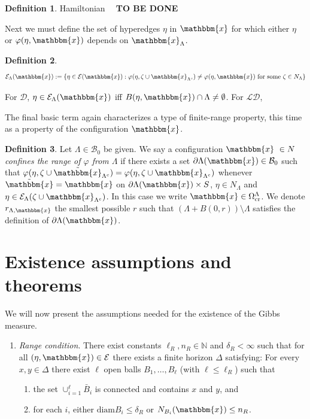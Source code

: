 \documentclass[12pt,a4paper]{article}
\theoremstyle{definition}
\newtheorem{definition}{Definition}
\theoremstyle{remark}
\theoremstyle{theorem}
\newcommand{\tbd}{\textbf{{\color{red}~ TO BE DONE ~}}}
\newcommand{\x}{\mathbbm{x}}
\begin{document}
\begin{definition} Hamiltonian \tbd
\end{definition}

Next we must define the set of hyperedges $\eta$ in $\x$ for which either $\eta$ or $\varphi(\eta,\x)$ depends on $\x_\Lambda$.

\begin{definition} 
$$\mathcal E_\Lambda(\x) := \{ \eta \in \mathcal E(\x): \varphi(\eta,\zeta \cup \x_{\Lambda^c}) \neq \varphi(\eta,\x) \text{ for some } \zeta \in N_\Lambda \}$$
\end{definition}

For $\mathcal D$, $\eta \in \mathcal E_\Lambda(\x)$ iff $B(\eta,\x) \cap \Lambda \neq \emptyset$. 
For $\mathcal {LD}$,   \newline

The final basic term again characterizes a type of finite-range property, this time as a property of the configuration $\x$.

\begin{definition}
	Let $\Lambda \in \mathcal B_0$ be given. We say a configuration $\x\ \in N$ \textit{confines the range of $\varphi$ from $\Lambda$} if there exists a set $\partial \Lambda(\x) \in \mathcal B_0$ such that $\varphi(\eta,\zeta \cup \tilde{\x}_{\Lambda^c}) = \varphi(\eta,\zeta\cup\x_{\Lambda^c})$ whenever $\tilde{\x} = \x$ on $\partial \Lambda(\x)\times S$, $\eta \in N_\Lambda$ and $\eta \in \mathcal E_\Lambda(\zeta\cup\x_{\Lambda^c})$. In this case we write $\x \in \Omega^\Lambda_\text{cr}$. We denote $r_{\Lambda,\x}$ the smallest possible $r$ such that $(\Lambda + B(0,r))\setminus \Lambda$ satisfies the definition of $\partial \Lambda(\x)$.
\end{definition}


\section{Existence assumptions and theorems}
We will now present the assumptions needed for the existence of the Gibbs measure.


\begin{enumerate}[\textbf{(R)}]
	\item \textit{Range condition}. There exist constants $\ell_R,n_R \in \mathbb N$ and $\delta_R < \infty$ such that for all $(\eta,\x) \in \mathcal E$ there exists a finite horizon $\Delta$ satisfying: For every $x,y \in \Delta$ there exist $\ell$ open balls $B_1, \dots, B_\ell$ (with $\ell \leq \ell_R$) such that
	\begin{enumerate}[-]
		\item the set $\cup^\ell_{i=1} \bar B_i$ is connected and contains $x$ and $y$, and 
		\item for each $i$, either $\text{diam} B_i \leq \delta_R$ or $N_{B_i}(\x) \leq n_R$.
	\end{enumerate}
\end{enumerate}
\end{document}
